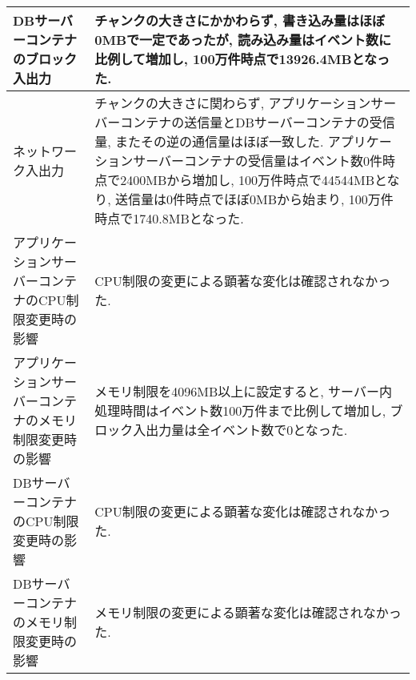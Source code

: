 \documentclass[../../../main]{subfiles}
\begin{document}
\begin{table}[H]
\begin{tabular}{|p{4cm}|p{10cm}|}
            DBサーバーコンテナのブロック入出力           & チャンクの大きさにかかわらず, 書き込み量はほぼ0MBで一定であったが, 読み込み量はイベント数に比例して増加し, 100万件時点で13926.4MBとなった.                                                                                               \\ \hline
            ネットワーク入出力                    & チャンクの大きさに関わらず, アプリケーションサーバーコンテナの送信量とDBサーバーコンテナの受信量, またその逆の通信量はほぼ一致した. アプリケーションサーバーコンテナの受信量はイベント数0件時点で2400MBから増加し, 100万件時点で44544MBとなり, 送信量は0件時点でほぼ0MBから始まり, 100万件時点で1740.8MBとなった.  \\ \hline
            アプリケーションサーバーコンテナのCPU制限変更時の影響 & CPU制限の変更による顕著な変化は確認されなかった.                                                                                                                                                  \\ \hline
            アプリケーションサーバーコンテナのメモリ制限変更時の影響 & メモリ制限を4096MB以上に設定すると, サーバー内処理時間はイベント数100万件まで比例して増加し, ブロック入出力量は全イベント数で0となった.                                                                                                   \\ \hline
            DBサーバーコンテナのCPU制限変更時の影響       & CPU制限の変更による顕著な変化は確認されなかった.                                                                                                                                                  \\ \hline
            DBサーバーコンテナのメモリ制限変更時の影響       & メモリ制限の変更による顕著な変化は確認されなかった.                                                                                                                                                  \\ \hline
        \end{tabular}
    \end{table}
\end{document}
